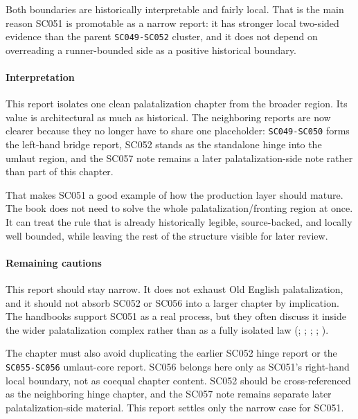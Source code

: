 \documentclass[
  british,
  a4paper,
]{article}
\begin{document}
Both boundaries are historically interpretable and fairly local. That is
the main reason SC051 is promotable as a narrow report: it has stronger
local two-sided evidence than the parent \texttt{SC049-SC052} cluster,
and it does not depend on overreading a runner-bounded side as a
positive historical boundary.

\paragraph{Interpretation}\label{interpretation-31}

This report isolates one clean palatalization chapter from the broader
region. Its value is architectural as much as historical. The
neighboring reports are now clearer because they no longer have to share
one placeholder: \texttt{SC049-SC050} forms the left-hand bridge report,
SC052 stands as the standalone hinge into the umlaut region, and the
SC057 note remains a later palatalization-side note rather than part of
this chapter.

That makes SC051 a good example of how the production layer should
mature. The book does not need to solve the whole
palatalization/fronting region at once. It can treat the rule that is
already historically legible, source-backed, and locally well bounded,
while leaving the rest of the structure visible for later review.

\paragraph{Remaining cautions}\label{remaining-cautions-31}

This report should stay narrow. It does not exhaust Old English
palatalization, and it should not absorb SC052 or SC056 into a larger
chapter by implication. The handbooks support SC051 as a real process,
but they often discuss it inside the wider palatalization complex rather
than as a fully isolated law (; ;
;
;
).

The chapter must also avoid duplicating the earlier SC052 hinge report
or the \texttt{SC055-SC056} umlaut-core report. SC056 belongs here only
as SC051's right-hand local boundary, not as coequal chapter content.
SC052 should be cross-referenced as the neighboring hinge chapter, and
the SC057 note remains separate later palatalization-side material. This
report settles only the narrow case for SC051.
\end{document}

